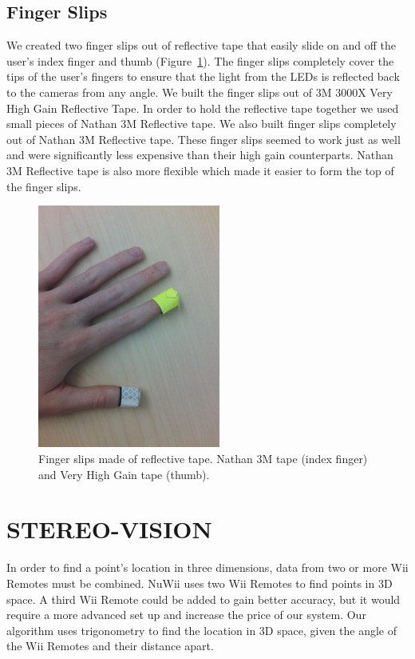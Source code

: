 \documentclass[a4paper,twoside]{article}
\begin{document}
\subsection{Finger Slips} We created two finger slips out of reflective tape
that easily slide on and off the user's index finger and thumb
(Figure~\ref{fingerslips}). The finger slips completely cover the tips of the
user's fingers to ensure that the light from the LEDs is reflected back to the
cameras from any angle. We built the finger slips out of 3M 3000X Very High
Gain Reflective Tape. In order to hold the reflective tape together we used
small pieces of Nathan 3M Reflective tape. We also built finger slips
completely out of Nathan 3M Reflective tape. These finger slips seemed to work
just as well and were significantly less expensive than their high gain
counterparts. Nathan 3M Reflective tape is also more flexible which made it
easier to form the top of the finger slips.  

\begin{figure}[h] \begin{center}
\includegraphics[width = 6cm]{fingerslips.png} \end{center} \caption{Finger
slips made of reflective tape.  Nathan 3M tape (index finger) and Very High
Gain tape (thumb).} \label{fingerslips} \end{figure}

\section{\uppercase{Stereo-Vision}}
\noindent In order to find a point's location in three dimensions, data from
two or more Wii Remotes must be combined. NuWii uses two Wii Remotes to find
points in 3D space. A third Wii Remote could be added to gain better accuracy,
but it would require a more advanced set up and increase the price of our
system. Our algorithm uses trigonometry to find the location in 3D space, given
the angle of the Wii Remotes and their distance apart.  
\end{document}

